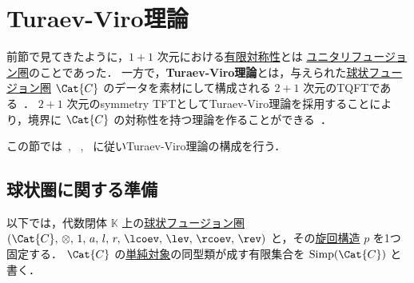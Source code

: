 \documentclass[TQFT_main]{subfiles}
\begin{document}
\section{Turaev-Viro理論}

前節で見てきたように，$1+1$ 次元における\hyperref[ax:symcat-2d-0form]{有限対称性}とは \hyperref[def:tensorfusion-cat]{ユニタリフュージョン圏}のことであった．
一方で，\textbf{Turaev-Viro理論}とは，与えられた\hyperref[def:spherical]{球状フュージョン圏} $\Cat{C}$ のデータを素材にして構成される $2+1$ 次元のTQFTである~\cite{TuraevViro1992TQFT}．
$2+1$ 次元のsymmetry TFTとしてTuraev-Viro理論を採用することにより，境界に $\Cat{C}$ の対称性を持つ理論を作ることができる~\cite{AFM2020}．

この節では~\cite{Turaev2017}, ~\cite{KirillovBalsam2010TVBW}, ~\cite{Bakalov2001lectures}に従いTuraev-Viro理論の構成を行う．

\subsection{球状圏に関する準備}

以下では，代数閉体 $\mathbb{K}$ 上の\hyperref[def:spherical]{球状フュージョン圏} $(\Cat{C},\, \otimes,\, 1,\, a,\, l,\, r,\, \lcoev,\, \lev,\, \rcoev,\, \rev)$ と，その\hyperref[def:pivotal]{旋回構造} $p$ を1つ固定する．
$\Cat{C}$ の\hyperref[def:semisimple-cat]{単純対象}の同型類が成す有限集合を $\mathrm{Simp}(\Cat{C})$ と書く．
\end{document}
